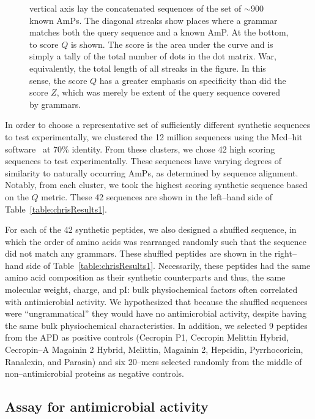\begin{figure}[ptb]
{            vertical axis lay the concatenated sequences of the set
            of $\sim$900 known AmPs.  The diagonal streaks show
            places where a grammar matches both the query sequence
            and a known AmP.  At the bottom, to score $Q$ is shown.
            The score is the area under the curve and is simply a
            tally of the total number of dots in the dot matrix.
            War, equivalently, the total length of all streaks in
            the figure.  In this sense, the score $Q$ has a greater
            emphasis on specificity than did the score $Z$, which
            was merely be extent of the query sequence covered by
            grammars.
        }
        \label{fig:dot2}
        \end{figure}


In order to choose a representative set of sufficiently different
synthetic sequences to test experimentally, we clustered the 12
million sequences using the Mcd--hit
software~\cite{li2001clustering} at 70\% identity. From these
clusters, we chose 42 high scoring sequences to test experimentally.
These sequences have varying degrees of similarity to naturally
occurring AmPs, as determined by sequence alignment. Notably, from
each cluster, we took the highest scoring synthetic sequence based
on the $Q$ metric. These 42 sequences are shown in the left--hand
side of Table~\vref{table:chrisResults1}.

    For each of the 42 synthetic peptides, we also
    designed a shuffled sequence, in which the order
    of amino acids was rearranged randomly such that
    the sequence did not match any grammars. These
    shuffled peptides are shown in the right--hand side of Table~\vref{table:chrisResults1}.
    Necessarily, these peptides had the same amino acid
    composition as their synthetic counterparts and
    thus, the same molecular weight, charge, and pI:
    bulk physiochemical factors often correlated with
    antimicrobial activity.  We hypothesized that
    because the shuffled sequences were ``ungrammatical''
    they would have no antimicrobial activity,
    despite having the same bulk physiochemical
    characteristics. In addition, we selected  9
    peptides from the APD as positive controls (Cecropin P1, Cecropin
Melittin Hybrid, Cecropin--A Magainin 2 Hybrid, Melittin, Magainin
2, Hepcidin, Pyrrhocoricin, Ranalexin, and Parasin) and
    six 20--mers selected randomly from the middle of non--antimicrobial proteins as
    negative controls.


\subsection{Assay for antimicrobial activity}

